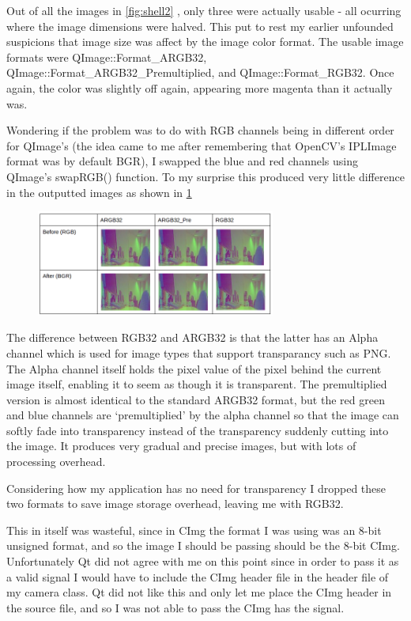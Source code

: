 Out of all the images in \cref{fig:shell2} , only three were actually usable - all ocurring where the image dimensions were halved. This put to rest my earlier unfounded suspicions that image size was affect by the image color format. The usable image formats were QImage::Format\_ARGB32, QImage::Format\_ARGB32\_Premultiplied, and QImage::Format\_RGB32.  Once again, the color was slightly off again, appearing more magenta than it actually was.

Wondering if the problem was to do with RGB channels being in different order for QImage’s (the idea came to me after remembering that OpenCV’s IPLImage format was by default BGR), I swapped the blue and red channels using QImage’s swapRGB() function. To my surprise this produced very little difference in the outputted images as shown in \cref{fig:swaprgb}
\begin{figure}
	\begin{center}
		\includegraphics[width=0.7\textwidth]{../images/qpix/swaprgb}
	\end{center}
	\vspace{-20pt}
	\caption{}
	\label{fig:swaprgb}
\end{figure}

 The difference between RGB32 and ARGB32 is that the latter has an Alpha channel which is used for image types that support transparancy such as PNG. The Alpha channel itself holds the pixel value of the pixel behind the current image itself, enabling it to seem as though it is transparent.  The premultiplied version is almost identical to the standard ARGB32 format, but the red green and blue channels are ‘premultiplied’ by the alpha channel so that the image can softly fade into transparency instead of the transparency suddenly cutting into the image. It produces very gradual and precise images, but with lots of processing overhead.

Considering how my application has no need for transparency I dropped these two formats to save image storage overhead, leaving me with RGB32. 

This in itself was wasteful, since in CImg the format I was using was an 8-bit unsigned format, and so the image I should be passing should be the 8-bit CImg. Unfortunately Qt did not agree with me on this point since in order to pass it as a valid signal I would have to include the CImg header file in the header file of my camera class. Qt did not like this and only let me place the CImg header in the source file, and so I was not able to pass the CImg has the signal.

